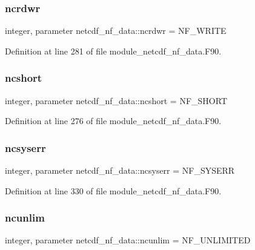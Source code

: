 \subsubsection{\texorpdfstring{ncrdwr}{ncrdwr}}
{\footnotesize\ttfamily integer, parameter netcdf\+\_\+nf\+\_\+data\+::ncrdwr = N\+F\+\_\+\+W\+R\+I\+TE}



Definition at line 281 of file module\+\_\+netcdf\+\_\+nf\+\_\+data.\+F90.

\mbox{\label{namespacenetcdf__nf__data_a61a645d51c75f3799902d5ad2ec1d35f}} 
\subsubsection{\texorpdfstring{ncshort}{ncshort}}
{\footnotesize\ttfamily integer, parameter netcdf\+\_\+nf\+\_\+data\+::ncshort = N\+F\+\_\+\+S\+H\+O\+RT}



Definition at line 276 of file module\+\_\+netcdf\+\_\+nf\+\_\+data.\+F90.

\mbox{\label{namespacenetcdf__nf__data_a1ce26f218da522526f3bb20543e9c1c4}} 
\subsubsection{\texorpdfstring{ncsyserr}{ncsyserr}}
{\footnotesize\ttfamily integer, parameter netcdf\+\_\+nf\+\_\+data\+::ncsyserr = N\+F\+\_\+\+S\+Y\+S\+E\+RR}



Definition at line 330 of file module\+\_\+netcdf\+\_\+nf\+\_\+data.\+F90.

\mbox{\label{namespacenetcdf__nf__data_af5632bf38434d6b35a1ffe750a5a74ec}} 
\subsubsection{\texorpdfstring{ncunlim}{ncunlim}}
{\footnotesize\ttfamily integer, parameter netcdf\+\_\+nf\+\_\+data\+::ncunlim = N\+F\+\_\+\+U\+N\+L\+I\+M\+I\+T\+ED}



